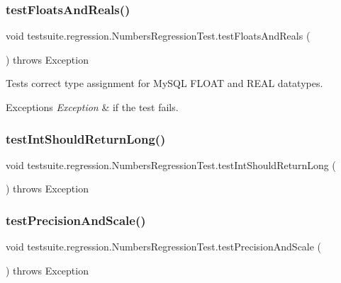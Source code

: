 \subsubsection{\texorpdfstring{test\+Floats\+And\+Reals()}{testFloatsAndReals()}}
{\footnotesize\ttfamily void testsuite.\+regression.\+Numbers\+Regression\+Test.\+test\+Floats\+And\+Reals (\begin{DoxyParamCaption}{ }\end{DoxyParamCaption}) throws Exception}

Tests correct type assignment for My\+S\+QL F\+L\+O\+AT and R\+E\+AL datatypes.


\begin{DoxyExceptions}{Exceptions}
{\em Exception} & if the test fails. \\
\hline
\end{DoxyExceptions}
\mbox{\label{classtestsuite_1_1regression_1_1_numbers_regression_test_ab804942f92985dc6aef8d3c368368e52}} 
\subsubsection{\texorpdfstring{test\+Int\+Should\+Return\+Long()}{testIntShouldReturnLong()}}
{\footnotesize\ttfamily void testsuite.\+regression.\+Numbers\+Regression\+Test.\+test\+Int\+Should\+Return\+Long (\begin{DoxyParamCaption}{ }\end{DoxyParamCaption}) throws Exception}

\mbox{\label{classtestsuite_1_1regression_1_1_numbers_regression_test_aad8beaba829a493efd49381a817144b9}} 
\subsubsection{\texorpdfstring{test\+Precision\+And\+Scale()}{testPrecisionAndScale()}}
{\footnotesize\ttfamily void testsuite.\+regression.\+Numbers\+Regression\+Test.\+test\+Precision\+And\+Scale (\begin{DoxyParamCaption}{ }\end{DoxyParamCaption}) throws Exception}

